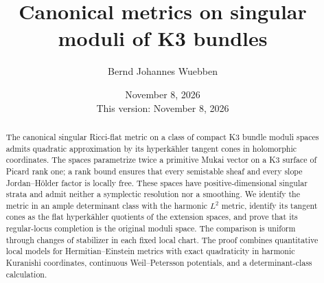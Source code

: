 \documentclass[11pt]{amsart}
\title[Canonical metrics on singular K3 moduli]{Canonical metrics on singular moduli of K3 bundles}
\author{Bernd Johannes Wuebben}
\date{November 8, 2026\\This version: November 8, 2026}
\theoremstyle{definition}
\theoremstyle{remark}
\begin{document}
\begin{abstract}
The canonical singular Ricci-flat metric on a class of compact K3
bundle moduli spaces admits quadratic approximation by its
hyperk\"ahler tangent cones in holomorphic coordinates. The spaces
parametrize twice a primitive Mukai vector on a K3 surface of Picard
rank one; a rank bound ensures that every semistable sheaf and every
slope Jordan--H\"older factor is locally free. These spaces have
positive-dimensional singular strata and admit neither a symplectic
resolution nor a smoothing. We identify the metric in an ample
determinant class with the harmonic $L^2$ metric, identify its tangent
cones as the flat hyperk\"ahler quotients of the extension spaces,
and prove that its regular-locus completion is the original moduli
space. The comparison is uniform through changes of stabilizer in
each fixed local chart. The proof combines quantitative local models
for Hermitian--Einstein metrics with exact quadraticity in harmonic
Kuranishi coordinates, continuous Weil--Petersson potentials, and a
determinant-class calculation.
\end{abstract}
\maketitle
\setcounter{tocdepth}{1}







\end{document}

